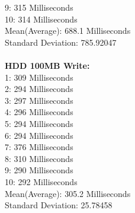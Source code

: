 \documentclass{article}
\begin{document}
9: 315 Milliseconds
\\
10: 314 Milliseconds
\\
Mean(Average): 688.1 Milliseconds
\\
Standard Deviation: 785.92047
\\
\\
\textbf{HDD 100MB Write:}
\\
1: 309 Milliseconds
\\
2: 294 Milliseconds
\\
3: 297 Milliseconds
\\
4: 296 Milliseconds
\\
5: 294 Milliseconds
\\
6: 294 Milliseconds
\\
7: 376 Milliseconds
\\
8: 310 Milliseconds
\\
9: 290 Milliseconds
\\
10: 292 Milliseconds
\\
Mean(Average): 305.2 Milliseconds
\\
Standard Deviation: 25.78458
\\
\\
\end{document}

